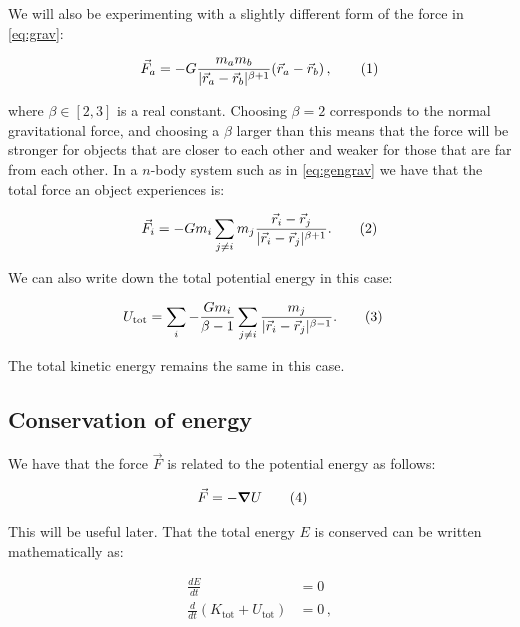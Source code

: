 \documentclass[reprint,english,notitlepage]{revtex4-1}  %
\newcommand\numberthis{\addtocounter{equation}{1}\tag{\theequation}}
\begin{document}
We will also be experimenting with a slightly different form of the force in \eqref{eq:grav}:

\begin{align*}
\vec{F}_a = - G \frac{m_a m_b}{|\vec{r}_a - \vec{r}_b|^{\beta + 1} } ( \vec{r}_a - \vec{r}_b) \, , \numberthis \label{eq:beta_grav}
\end{align*}

where $\beta \in [2,3]$ is a real constant. Choosing $\beta = 2$ corresponds to the normal gravitational force, and choosing a $\beta$ larger than this means that the force will be stronger for objects that are closer to each other and weaker for those that are far from each other. In a $n$-body system such as in \eqref{eq:gengrav} we have that the total force an object experiences is:

\begin{align*}
\vec{F}_{i} = -Gm_{i}\sum_{j\neq i}m_{j}\frac{\vec{r}_{i}-\vec{r}_{j}}{|\vec{r}_{i}-\vec{r}_{j}|^{\beta + 1}}. \numberthis \label{eq:beta_gengrav}
\end{align*}

We can also write down the total potential energy in this case:

\begin{align*}
U_\text{tot} &= \sum\limits_i - \frac{G m_i}{\beta - 1} \sum\limits_{j\neq i} \frac{m_j}{|\vec{r}_i - \vec{r}_j|^{\beta-1}} . \numberthis \label{eq:beta_tot_pot_en}
\end{align*}

The total kinetic energy remains the same in this case.

\subsection{Conservation of energy} \label{sec:II:c}

We have that the force $\vec{F}$ is related to the potential energy as follows:

\begin{align*}
\vec{F} &= - \gradient U \numberthis \label{eq:force_pot_en}
\end{align*}

This will be useful later. That the total energy $E$ is conserved can be written mathematically as:

\begin{align*}
\frac{dE}{dt} &= 0 \\
\frac{d}{dt} (K_\text{tot} + U_\text{tot}) &= 0 \, ,
\end{align*} 
\end{document}
